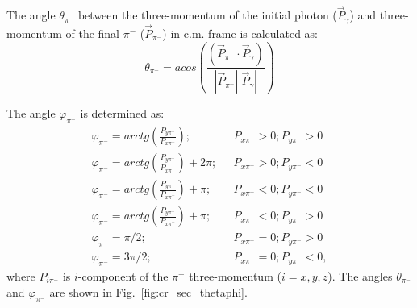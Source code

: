 The angle $\theta_{\pi^{-}}$ between the three-momentum of the initial photon ($\vec P_{\gamma}$) and three-momentum of the final $\pi^{-}$ ($\vec P_{\pi^{-}}$) in 
c.m. frame is calculated as:
\begin{equation}
\theta_{\pi^{-}} = acos\left( \frac{(\vec P_{\pi^{-}} \cdot \vec P_{\gamma})}
{|\vec P_{\pi^{-}}| |\vec P_{\gamma}|} \right)
\label{angletheta}
\end{equation} 


The angle $\varphi_{\pi^{-}}$ is determined as:
\begin{equation}
\begin{aligned}
\varphi_{\pi^{-}} = arctg\left( \frac{P_{y
\pi^{-}}}{P_{x\pi^{-}}} \right)\!; & \text{ }
P_{x\pi^{-}} > 0 ; P_{y\pi^{-}} > 0 \\
\varphi_{\pi^{-}} = arctg\left( \frac{P_{y
\pi^{-}}}{P_{x\pi^{-}}} \right) + 2\pi; & \text{ }
P_{x\pi^{-}} > 0 ; P_{y\pi^{-}} < 0 \\
\varphi_{\pi^{-}} = arctg\left( \frac{P_{y
\pi^{-}}}{P_{x\pi^{-}}} \right) + \pi; & \text{ }
P_{x\pi^{-}} < 0 ; P_{y\pi^{-}} < 0 \\
\varphi_{\pi^{-}} = arctg\left( \frac{P_{y
\pi^{-}}}{P_{x\pi^{-}}} \right) + \pi; & \text{ }
P_{x\pi^{-}} < 0 ; P_{y\pi^{-}} > 0  \\
\varphi_{\pi^{-}} = \pi/2; & \text{ }
P_{x\pi^{-}} = 0 ; P_{y\pi^{-}} > 0  \\
\varphi_{\pi^{-}} = 3\pi/2; & \text{ }
P_{x\pi^{-}} = 0 ; P_{y\pi^{-}} < 0, 
\end{aligned}
\end{equation}
where $P_{i\pi^{-}}$ is $i$-component of the $\pi^{-}$ three-momentum ($i = x,y,z$).
The angles $\theta_{\pi^{-}}$ and $\varphi_{\pi^{-}}$ are shown in Fig.~\ref{fig:cr_sec_thetaphi}.

